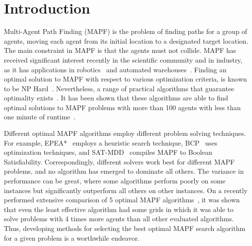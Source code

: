 \documentclass{ecai}
\newcommand{\shortcite}[1]{\cite{#1}}
\begin{document}
\section{Introduction}
\label{scn:Intro}

Multi-Agent Path Finding (MAPF) is the problem of finding paths for a group of agents, moving each agent from its initial location to a designated target location. 
The main constraint in MAPF is that the agents must not collide. 
MAPF has received significant interest recently in the scientific community and in industry, as it has applications in robotics~\cite{veloso2015cobots} and automated warehouses~\cite{wurman2008coordinating}. 
Finding an optimal solution to MAPF with respect to various optimization criteria, is known to be NP Hard~\cite{anOptimization2010surynek,structure2013yu}. 
Nevertheless, a range of practical algorithms that guarantee optimality exists~\cite{kornhauser1984pebble,surynek2009novel}. 
It has been shown that these algorithms are able to find optimal solutions to MAPF problems with more than 100 agents with less than one minute of runtime~\cite{li2021pairwise}. 

Different optimal MAPF algorithms employ different problem solving techniques. For example, EPEA*~\cite{goldenberg2014enhanced} employs a heuristic search technique, BCP~\cite{lam2022branch} uses optimization techniques, and SAT-MDD~\cite{surynek2016efficient} compiles MAPF to Boolean Satisfiability. 
Correspondingly, different solvers work best for different MAPF problems, and no algorithm has emerged to dominate all others. 
The variance in performance can be great, where some algorithms perform poorly on some instances but significantly outperform all others on other instances. 
On a recently performed extensive comparison of 5 optimal MAPF algorithms~\cite{kaduri2021experimental}, it was shown that even the least effective algorithm had some grids in which it was able to solve problems with 4 times more agents than all other evaluated algorithms. %
Thus, developing methods for selecting the best optimal MAPF search algorithm for a given problem is a worthwhile endeavor. %


\end{document}
